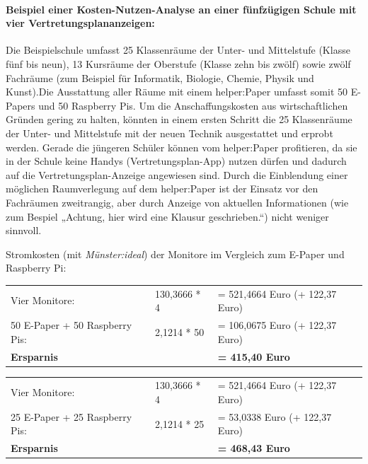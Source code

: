\documentclass[10pt]{article}
\begin{document}
\paragraph{Beispiel einer Kosten-Nutzen-Analyse an einer fünfzügigen 
Schule mit vier Vertretungsplananzeigen: }

Die Beispielschule umfasst 25 Klassenräume der Unter- und Mittelstufe (Klasse fünf bis neun), 13 Kursräume der Oberstufe (Klasse zehn bis zwölf) sowie zwölf Fachräume (zum Beispiel für Informatik, Biologie, Chemie, Physik und Kunst).Die Ausstattung aller Räume mit einem helper:Paper umfasst somit 50 E-Papers und 50 Raspberry Pis. Um die Anschaffungskosten aus wirtschaftlichen Gründen gering zu halten, könnten in einem ersten Schritt die 25 Klassenräume der Unter- und Mittelstufe mit der neuen Technik ausgestattet und erprobt werden. Gerade die jüngeren Schüler können vom helper:Paper profitieren, da sie in der Schule keine Handys (Vertretungsplan-App) nutzen dürfen und dadurch auf die Vertretungsplan-Anzeige angewiesen sind. Durch die Einblendung einer möglichen Raumverlegung auf dem helper:Paper ist der Einsatz vor den Fachräumen zweitrangig, aber durch Anzeige von aktuellen Informationen (wie zum Bespiel „Achtung, hier wird eine Klausur geschrieben.“) nicht weniger sinnvoll.
\newline

\noindent
Stromkosten (mit \textit{Münster:ideal}) der Monitore im Vergleich zum E-Paper und Raspberry Pi: \newline
\begin{tabular}{lll}

    Vier Monitore:   & 130,3666 * 4 & = 521,4664 Euro (+ 122,37 Euro)\\
    50 E-Paper + 50 Raspberry Pis: & 2,1214 * 50 & = 106,0675 Euro (+ 122,37 Euro)\\  \hline
    \textbf{Ersparnis} & & \textbf{= 415,40 Euro} 
\end{tabular}
\newline

\noindent
\begin{tabular}{lll}
  Vier Monitore:   & 130,3666 * 4 & = 521,4664 Euro (+ 122,37 Euro) \\
    25 E-Paper + 25 Raspberry Pis: & 2,1214 * 25 & = 53,0338 Euro (+ 122,37 Euro)\\  \hline
    \textbf{Ersparnis} & & \textbf{= 468,43 Euro}
\end{tabular}
\newline
\end{document}
